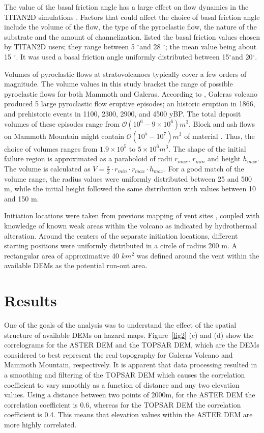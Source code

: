 \documentclass[12pt]{article}
\newcommand{\Deg}{$^{\circ}$}
\begin{document}
The value of the basal friction angle has a large effect on flow
dynamics in the TITAN2D simulations \citep{Patra2005,
  stinton_2006}. Factors that could affect the choice of basal
friction angle include the volume of the flow, the type of the
pyroclastic flow, the nature of the substrate and the amount of
channelization. \citet{murcia_2010} listed the basal friction values
chosen by TITAN2D users; they range between 5 \Deg and 28 \Deg; the mean
value being about 15 \Deg. It was used a basal friction angle
uniformly distributed between 15\Deg and 20\Deg.
 
Volumes of pyroclastic flows at stratovolcanoes typically cover a few
orders of magnitude. The volume values in this study bracket the range
of possible pyroclastic flows for both Mammoth and Galeras.  According
to \citet{calvache_1990a}, Galeras volcano produced 5 large
pyroclastic flow eruptive episodes; an historic eruption in 1866, and
prehistoric events in 1100, 2300, 2900, and 4500 yBP.  The total
deposit volumes of these episodes range from $\mathcal{O}(10^6 - 9\times 10^6)
m^3$.  Block and ash flows on Mammoth Mountain might contain $\mathcal{O}(10^5 -
10^7) m^3$ of material \citep{Patra2005, Burkett2007}.  Thus, the
choice of volumes ranges from $1.9 \times 10^5$ to $5 \times 10^6
m^3$.  The shape of the initial failure region is approximated as a
paraboloid of radii $r_{max}$, $r_{min}$ and height $h_{max}$. The volume is calculated as $
V=\frac{\pi}{2}\cdot r_{min}\cdot r_{max} \cdot h_{max}. $ For a good
match of the volume range, the radius values were uniformly
distributed between 25 and 500 m, while the initial height followed
the same distribution with values between 10 and 150 m.

Initiation locations were taken from previous mapping of vent sites \citep{Bailey1989},
coupled with knowledge of known weak areas within the volcano as
indicated by hydrothermal alteration.  Around the centers of the
separate initiation locations, different starting positions were
uniformly distributed in a circle of radius 200 m.  A rectangular area
of approximative 40 $km^2$ was defined around the vent within the
available DEMs as the potential run-out area.

\section{Results}

One of the goals of the analysis was to understand the effect of the
spatial structure of available DEMs on hazard maps. Figure~\ref{fig2}
(c) and (d) show the correlograms for the ASTER DEM and the TOPSAR
DEM, which are the DEMs considered to best represent the real
topography for Galeras Volcano and Mammoth Mountain, respectively. It
is apparent that data processing resulted in a smoothing and filtering
of the TOPSAR DEM which causes the correlation coefficient to vary
smoothly as a function of distance and any two elevation values.
Using a distance between two points of 2000m, for the ASTER DEM the
correlation coefficient is 0.6, whereas for the TOPSAR DEM the
correlation coefficient is 0.4. This means that elevation values
within the ASTER DEM are more highly correlated.
\end{document}
